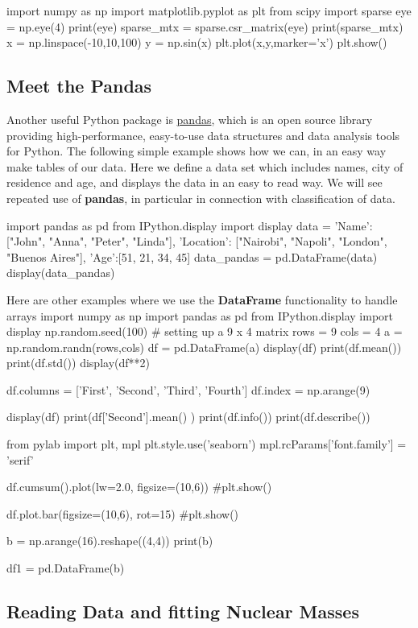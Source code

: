 \documentclass[%
oneside,                 %
final,                   %
10pt]{article}
\begin{document}
\bpycod
import numpy as np
import matplotlib.pyplot as plt
from scipy import sparse
eye = np.eye(4)
print(eye)
sparse_mtx = sparse.csr_matrix(eye)
print(sparse_mtx)
x = np.linspace(-10,10,100)
y = np.sin(x)
plt.plot(x,y,marker='x')
plt.show()
\epycod


\subsection{Meet the Pandas}

Another useful Python package is
\href{{https://pandas.pydata.org/}}{pandas}, which is an open source library
providing high-performance, easy-to-use data structures and data
analysis tools for Python. The following simple example shows how we can, in an easy way make tables of our data. Here we define a data set which includes names, city of residence and age, and displays the data in an easy to read way. We will see repeated use of \textbf{pandas}, in particular in connection with classification of data. 

\bpycod
import pandas as pd
from IPython.display import display
data = {'Name': ["John", "Anna", "Peter", "Linda"], 'Location': ["Nairobi", "Napoli", "London", "Buenos Aires"], 'Age':[51, 21, 34, 45]}
data_pandas = pd.DataFrame(data)
display(data_pandas)
\epycod

Here are other examples where we use the \textbf{DataFrame} functionality to handle arrays
\bpycod
import numpy as np
import pandas as pd
from IPython.display import display
np.random.seed(100)
# setting up a 9 x 4 matrix
rows = 9
cols = 4
a = np.random.randn(rows,cols)
df = pd.DataFrame(a)
display(df)
print(df.mean())
print(df.std())
display(df**2)


df.columns = ['First', 'Second', 'Third', 'Fourth']
df.index = np.arange(9)

display(df)
print(df['Second'].mean() )
print(df.info())
print(df.describe())

from pylab import plt, mpl
plt.style.use('seaborn')
mpl.rcParams['font.family'] = 'serif'

df.cumsum().plot(lw=2.0, figsize=(10,6))
#plt.show()


df.plot.bar(figsize=(10,6), rot=15)
#plt.show()


b = np.arange(16).reshape((4,4))
print(b)

df1 = pd.DataFrame(b)

\epycod


\subsection{Reading Data and fitting Nuclear Masses}
\end{document}
